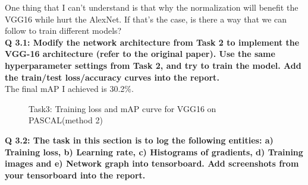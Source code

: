 \documentclass[12pt]{report}
\begin{document}
\begin{outline}
One thing that I can't understand is that why the normalization will benefit the VGG16 while hurt the AlexNet. If that's the case, is there a way that we can follow to train different models?\\

\textbf{Q 3.1: Modify the network architecture from Task 2 to implement the VGG-16 architecture (refer to the original paper). Use the same hyperparameter settings from Task 2, and try to train the model. Add the train/test loss/accuracy curves into the report.}\\

The final mAP I achieved is 30.2\%.

\begin{figure}[!h]
  \centering
  \caption{Task3: Training loss and mAP curve for VGG16 on PASCAL(method 2)}
\label{fig:short}
\end{figure}

\textbf{Q 3.2: The task in this section is to log the following entities: a) Training loss, b) Learning rate, c) Histograms of gradients, d) Training images and e) Network graph into tensorboard. Add screenshots from your tensorboard into the report.}\\


\end{outline}
\end{document}
